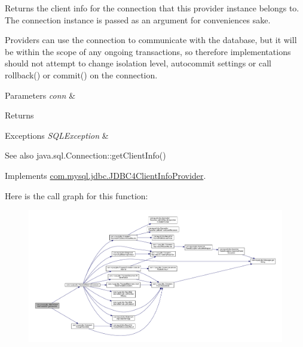 Returns the client info for the connection that this provider instance belongs to. The connection instance is passed as an argument for convenience\textquotesingle{}s sake.

Providers can use the connection to communicate with the database, but it will be within the scope of any ongoing transactions, so therefore implementations should not attempt to change isolation level, autocommit settings or call rollback() or commit() on the connection.


\begin{DoxyParams}{Parameters}
{\em conn} & \\
\hline
\end{DoxyParams}
\begin{DoxyReturn}{Returns}

\end{DoxyReturn}

\begin{DoxyExceptions}{Exceptions}
{\em S\+Q\+L\+Exception} & \\
\hline
\end{DoxyExceptions}
\begin{DoxySeeAlso}{See also}
java.\+sql.\+Connection\+::get\+Client\+Info() 
\end{DoxySeeAlso}


Implements \mbox{\hyperlink{interfacecom_1_1mysql_1_1jdbc_1_1_j_d_b_c4_client_info_provider_a7e0893a815f6b668deec04d40d60e985}{com.\+mysql.\+jdbc.\+J\+D\+B\+C4\+Client\+Info\+Provider}}.

Here is the call graph for this function\+:
\nopagebreak
\begin{figure}[H]
\begin{center}
\leavevmode
\includegraphics[width=350pt]{classcom_1_1mysql_1_1jdbc_1_1_j_d_b_c4_client_info_provider_s_p_a75c1a50050648fcab79401cd73342756_cgraph}
\end{center}
\end{figure}
\mbox{\label{classcom_1_1mysql_1_1jdbc_1_1_j_d_b_c4_client_info_provider_s_p_a0b8221fb4e29722d7570124d595944fd}} 
